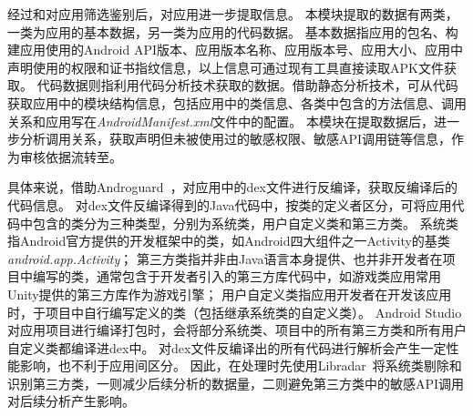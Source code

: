 经过\componentA 和\componentB 对应用筛选鉴别后，\componentC 对应用进一步提取信息。
本模块提取的数据有两类，一类为应用的基本数据，另一类为应用的代码数据。
基本数据指应用的包名、构建应用使用的Android API版本、应用版本名称、应用版本号、应用大小、应用中声明使用的权限和证书指纹信息，以上信息可通过现有工具直接读取APK文件获取。
代码数据则指利用代码分析技术获取的数据。借助静态分析技术，\componentC 可从代码获取应用中的模块结构信息，包括应用中的类信息、各类中包含的方法信息、调用关系和应用写在\textit{AndroidManifest.xml}文件中的配置。
本模块在提取数据后，进一步分析调用关系，获取声明但未被使用过的敏感权限、敏感API调用链等信息，作为审核依据流转至\componentD 。

具体来说，\componentC 借助Androguard~\cite{Androguard}，对应用中的dex文件进行反编译，获取反编译后的代码信息。
对dex文件反编译得到的Java代码中，按类的定义者区分，可将应用代码中包含的类分为三种类型，分别为系统类，用户自定义类和第三方类。
系统类指Android官方提供的开发框架中的类，如Android四大组件之一Activity的基类\textit{android.app.Activity}；
第三方类指并非由Java语言本身提供、也并非开发者在项目中编写的类，通常包含于开发者引入的第三方库代码中，如游戏类应用常用Unity提供的第三方库作为游戏引擎；
用户自定义类指应用开发者在开发该应用时，于项目中自行编写定义的类（包括继承系统类的自定义类）。
Android Studio对应用项目进行编译打包时，会将部分系统类、项目中的所有第三方类和所有用户自定义类都编译进dex中。
对dex文件反编译出的所有代码进行解析会产生一定性能影响，也不利于应用间区分。
因此，\componentC 在处理时先使用Libradar~\cite{ma2016libradar}将系统类剔除和识别第三方类，一则减少后续分析的数据量，二则避免第三方类中的敏感API调用对后续分析产生影响。


